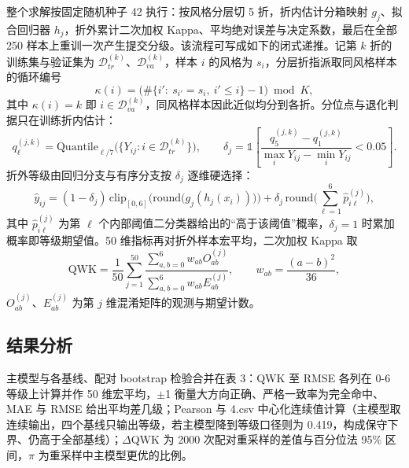 \documentclass[zihao=-4,a4paper,UTF8,fontset=none]{ctexart}
\begin{document}
整个求解按固定随机种子 42 执行：按风格分层切 5 折，折内估计分箱映射 $g_j$、拟合回归器 $h_j$，折外累计二次加权 Kappa、平均绝对误差与决定系数，最后在全部 250 样本上重训一次产生提交分级。该流程可写成如下的闭式递推。记第 $k$ 折的训练集与验证集为 $\mathcal{D}^{(k)}_{tr}$、$\mathcal{D}^{(k)}_{va}$，样本 $i$ 的风格为 $s_i$，分层折指派取同风格样本的循环编号
\begin{equation}
\kappa(i)=\big(\#\{i':\ s_{i'}=s_i,\ i'\le i\}-1\big)\bmod K,
\end{equation}
其中 $\kappa(i)=k$ 即 $i\in\mathcal{D}^{(k)}_{va}$，同风格样本因此近似均分到各折。分位点与退化判据只在训练折内估计：
\begin{equation}
q^{(j,k)}_\ell=\mathrm{Quantile}_{\ell/7}\big(\{Y_{ij}:i\in\mathcal{D}^{(k)}_{tr}\}\big),\qquad
\delta_j=\mathbb{1}\!\left[\frac{q^{(j,k)}_5-q^{(j,k)}_1}{\max_i Y_{ij}-\min_i Y_{ij}}<0.05\right].
\end{equation}
折外等级由回归分支与有序分支按 $\delta_j$ 逐维硬选择：
\begin{equation}
\hat y_{ij}=(1-\delta_j)\,\mathrm{clip}_{[0,6]}\!\Big(\mathrm{round}\big(g_j(h_j(x_i))\big)\Big)+\delta_j\,\mathrm{round}\!\Big(\sum_{\ell=1}^{6}\hat p^{(j)}_{i\ell}\Big),
\end{equation}
其中 $\hat p^{(j)}_{i\ell}$ 为第 $\ell$ 个内部阈值二分类器给出的“高于该阈值”概率，$\delta_j=1$ 时累加概率即等级期望值。50 维指标再对折外样本宏平均，二次加权 Kappa 取
\begin{equation}
\mathrm{QWK}=\frac{1}{50}\sum_{j=1}^{50}\frac{\sum_{a,b=0}^{6}w_{ab}O^{(j)}_{ab}}{\sum_{a,b=0}^{6}w_{ab}E^{(j)}_{ab}},\qquad w_{ab}=\frac{(a-b)^2}{36},
\end{equation}
$O^{(j)}_{ab}$、$E^{(j)}_{ab}$ 为第 $j$ 维混淆矩阵的观测与期望计数。

\subsection{结果分析}

主模型与各基线、配对 bootstrap 检验合并在表 3：QWK 至 RMSE 各列在 0-6 等级上计算并作 50 维宏平均，$\pm$1 衡量大方向正确、严格一致率为完全命中、MAE 与 RMSE 给出平均差几级；Pearson 与 4.csv 中心化连续值计算（主模型取连续输出，四个基线只输出等级，若主模型降到等级口径则为 0.419，构成保守下界、仍高于全部基线）；$\Delta$QWK 为 2000 次配对重采样的差值与百分位法 95\% 区间，$\pi$ 为重采样中主模型更优的比例。
\end{document}
